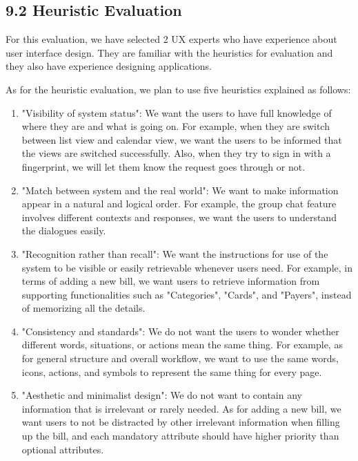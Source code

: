 \documentclass{sigchi}
\begin{document}
\subsection{9.2 Heuristic Evaluation}

For this evaluation, we have selected 2 UX experts who have experience about user interface design. They are familiar with the heuristics for evaluation and they also have experience designing applications. 

As for the heuristic evaluation, we plan to use five heuristics explained as follows:

\begin{enumerate}
\item "Visibility of system status": We want the users to have full knowledge of where they are and what is going on. For example, when they are switch between list view and calendar view, we want the users to be informed that the views are switched successfully. Also, when they try to sign in with a fingerprint, we will let them know the request goes through or not.

\item "Match between system and the real world": We want to make information appear in a natural and logical order. For example, the group chat feature involves different contexts and responses, we want the users to understand the dialogues easily.

\item "Recognition rather than recall": We want the instructions for use of the system to be visible or easily retrievable whenever users need. For example, in terms of adding a new bill, we want users to retrieve information from supporting functionalities such as "Categories", "Cards",  and "Payers", instead of memorizing all the details.

\item "Consistency and standards": We do not want the users to wonder whether different words, situations, or actions mean the same thing. For example, as for general structure and overall workflow, we want to use the same words, icons, actions, and symbols to represent the same thing for every page.

\item "Aesthetic and minimalist design": We do not want to contain any information that is irrelevant or rarely needed. As for adding a new bill, we want users to not be distracted by other irrelevant information when filling up the bill, and each mandatory attribute should have higher priority than optional attributes. 

\end{enumerate}
\end{document}
